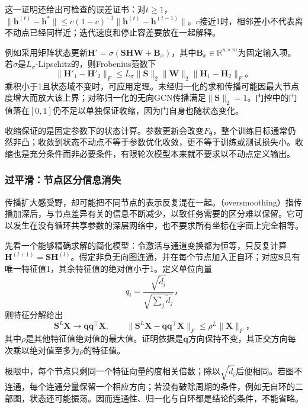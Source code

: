 这一证明还给出可检查的误差证书：对$t\geq1$，$\lVert\bm{h}^{(t)}-\bm{h}^*\rVert\leq c(1-c)^{-1}\lVert\bm{h}^{(t)}-\bm{h}^{(t-1)}\rVert$。$c$接近1时，相邻差小不代表离不动点已经同样近；迭代速度和停止容差要放在一起解释。

例如采用矩阵状态更新$\bm{H}'=\sigma(\bm{S}\bm{H}\bm{W}+\bm{B}_x)$，其中$\bm{B}_x\in\mathbb{R}^{n\times m}$为固定输入项。若$\sigma$是$L_\sigma$-Lipschitz的，则Frobenius范数下
\begin{equation}
  \lVert\bm{H}'_1-\bm{H}'_2\rVert_F
    \leq L_\sigma\lVert\bm{S}\rVert_2\lVert\bm{W}\rVert_2
      \lVert\bm{H}_1-\bm{H}_2\rVert_F\text{。}
  \label{eq:gnn-state-lipschitz}
\end{equation}
乘积小于1且状态域不变时，可应用定理。未经归一化的求和传播可能因最大节点度增大而放大该上界；对称归一化的无向GCN传播满足$\lVert\bm{S}\rVert_2=1$。门控中的门值落在$[0,1]$仍不足以单独保证收缩，因为门自身也随状态变化。

收缩保证的是固定参数下的状态计算。参数更新会改变$F_{\bm{\theta}}$，整个训练目标通常仍然非凸；收敛到状态不动点不等于参数优化收敛，更不等于训练或测试损失小。收缩也是充分条件而非必要条件，有限轮次模型本来就不要求以不动点定义输出。

\subsubsection{过平滑：节点区分信息消失}
\label{sec:gnn-oversmoothing}

传播扩大感受野，却可能把不同节点的表示反复混在一起。（oversmoothing）指传播加深后，与节点差异有关的信息不断减少，以致任务需要的区分难以保留。它可以发生在没有循环共享参数的深层网络中，也不要求所有坐标在字面上完全相等。

先看一个能够精确求解的简化模型：令激活与通道变换都为恒等，只反复计算$\bm{H}^{(l+1)}=\bm{S}\bm{H}^{(l)}$。假定非负无向图连通，并在每个节点加入正自环；对应$\bm{S}$具有唯一特征值1，其余特征值的绝对值小于1。定义单位向量
\[
  q_i=\frac{\sqrt{\widetilde d_i}}{\sqrt{\sum_j\widetilde d_j}}\text{，}
\]
则特征分解给出
\begin{equation}
  \bm{S}^L\bm{X}\longrightarrow\bm{q}\bm{q}^{\top}\bm{X},\qquad
  \lVert\bm{S}^L\bm{X}-\bm{q}\bm{q}^{\top}\bm{X}\rVert_F
    \leq\rho^L\lVert\bm{X}\rVert_F\text{，}
  \label{eq:gnn-linear-oversmoothing}
\end{equation}
其中$\rho$是其他特征值绝对值的最大值。证明依据是$\bm{q}$方向保持不变，其正交方向每次乘以绝对值至多为$\rho$的特征值。

极限中，每个节点只剩同一个特征向量的度相关倍数；除以$\sqrt{\widetilde d_i}$后便相同。若图不连通，每个连通分量保留一个相应方向；若没有破除周期的条件，例如无自环的二部图，状态还可能振荡。因而连通性、归一化与自环都是结论的条件，不能省略。

